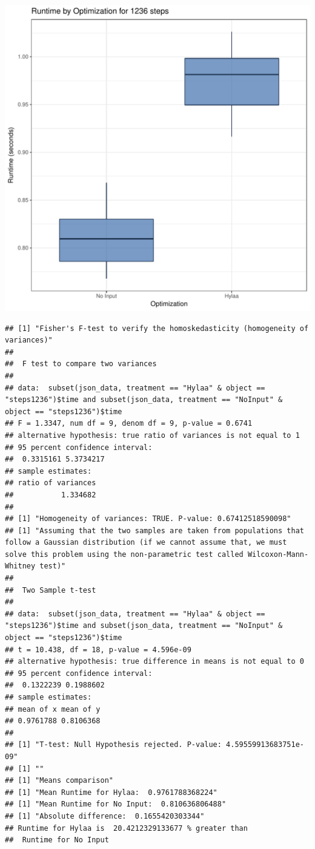 \documentclass{article}\usepackage[]{graphicx}\usepackage[]{color}
\makeatletter
\def\maxwidth{ %
  \ifdim\Gin@nat@width>\linewidth
    \linewidth
  \else
    \Gin@nat@width
  \fi
}
\newenvironment{kframe}{%
 \def\at@end@of@kframe{}%
 \ifinner\ifhmode%
  \def\at@end@of@kframe{\end{minipage}}%
  \begin{minipage}{\columnwidth}%
 \fi\fi%
 \def\FrameCommand##1{\hskip\@totalleftmargin \hskip-\fboxsep
 \colorbox{shadecolor}{##1}\hskip-\fboxsep
     \hskip-\linewidth \hskip-\@totalleftmargin \hskip\columnwidth}%
 \MakeFramed {\advance\hsize-\width
   \@totalleftmargin\z@ \linewidth\hsize
   \@setminipage}}%
 {\par\unskip\endMakeFramed%
 \at@end@of@kframe}
\newenvironment{knitrout}{}{} %
\makeatother
\begin{document}
\begin{knitrout}
\color{fgcolor}
\includegraphics[width=\maxwidth]{figure/RH4_steps1236-1} 
\begin{kframe}\begin{verbatim}
## [1] "Fisher's F-test to verify the homoskedasticity (homogeneity of variances)"
## 
## 	F test to compare two variances
## 
## data:  subset(json_data, treatment == "Hylaa" & object == "steps1236")$time and subset(json_data, treatment == "NoInput" & object == "steps1236")$time
## F = 1.3347, num df = 9, denom df = 9, p-value = 0.6741
## alternative hypothesis: true ratio of variances is not equal to 1
## 95 percent confidence interval:
##  0.3315161 5.3734217
## sample estimates:
## ratio of variances 
##           1.334682 
## 
## [1] "Homogeneity of variances: TRUE. P-value: 0.67412518590098"
## [1] "Assuming that the two samples are taken from populations that follow a Gaussian distribution (if we cannot assume that, we must solve this problem using the non-parametric test called Wilcoxon-Mann-Whitney test)"
## 
## 	Two Sample t-test
## 
## data:  subset(json_data, treatment == "Hylaa" & object == "steps1236")$time and subset(json_data, treatment == "NoInput" & object == "steps1236")$time
## t = 10.438, df = 18, p-value = 4.596e-09
## alternative hypothesis: true difference in means is not equal to 0
## 95 percent confidence interval:
##  0.1322239 0.1988602
## sample estimates:
## mean of x mean of y 
## 0.9761788 0.8106368 
## 
## [1] "T-test: Null Hypothesis rejected. P-value: 4.59559913683751e-09"
## [1] ""
## [1] "Means comparison"
## [1] "Mean Runtime for Hylaa:  0.9761788368224"
## [1] "Mean Runtime for No Input:  0.810636806488"
## [1] "Absolute difference:  0.1655420303344"
## Runtime for Hylaa is  20.4212329133677 % greater than 
##  Runtime for No Input
\end{verbatim}
\end{kframe}
\end{knitrout}
\end{document}
